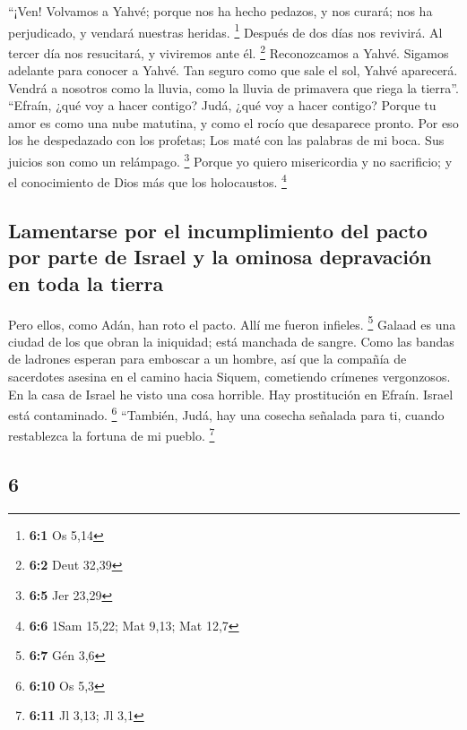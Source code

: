 \begin{paracol}{2}
 ``¡Ven! Volvamos a Yahvé; porque nos ha hecho pedazos, y
nos curará; nos ha perjudicado, y vendará nuestras heridas. \footnote{\textbf{6:1}
  Os 5,14}  Después de dos días nos revivirá. Al tercer
día nos resucitará, y viviremos ante él. \footnote{\textbf{6:2} Deut
  32,39}  Reconozcamos a Yahvé. Sigamos adelante para
conocer a Yahvé. Tan seguro como que sale el sol, Yahvé aparecerá.
Vendrá a nosotros como la lluvia, como la lluvia de primavera que riega
la tierra''.  ``Efraín, ¿qué voy a hacer contigo? Judá,
¿qué voy a hacer contigo? Porque tu amor es como una nube matutina, y
como el rocío que desaparece pronto.  Por eso los he
despedazado con los profetas; Los maté con las palabras de mi boca. Sus
juicios son como un relámpago. \footnote{\textbf{6:5} Jer 23,29}
 Porque yo quiero misericordia y no sacrificio; y el
conocimiento de Dios más que los holocaustos. \footnote{\textbf{6:6}
  1Sam 15,22; Mat 9,13; Mat 12,7}

\hypertarget{lamentarse-por-el-incumplimiento-del-pacto-por-parte-de-israel-y-la-ominosa-depravaciuxf3n-en-toda-la-tierra}{%
\subsection{Lamentarse por el incumplimiento del pacto por parte de
Israel y la ominosa depravación en toda la
tierra}\label{lamentarse-por-el-incumplimiento-del-pacto-por-parte-de-israel-y-la-ominosa-depravaciuxf3n-en-toda-la-tierra}}

 Pero ellos, como Adán, han roto el pacto. Allí me fueron
infieles. \footnote{\textbf{6:7} Gén 3,6}  Galaad es una
ciudad de los que obran la iniquidad; está manchada de sangre.
 Como las bandas de ladrones esperan para emboscar a un
hombre, así que la compañía de sacerdotes asesina en el camino hacia
Siquem, cometiendo crímenes vergonzosos.  En la casa de
Israel he visto una cosa horrible. Hay prostitución en Efraín. Israel
está contaminado. \footnote{\textbf{6:10} Os 5,3} 
``También, Judá, hay una cosecha señalada para ti, cuando restablezca la
fortuna de mi pueblo. \footnote{\textbf{6:11} Jl 3,13; Jl 3,1}

\switchcolumn
\begin{otherlanguage}{english}

\hypertarget{section-11}{%
\section{6}\label{section-11}}


\end{otherlanguage}
\end{paracol}
